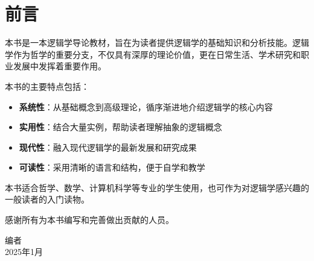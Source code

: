 \chapter*{前言}

本书是一本逻辑学导论教材，旨在为读者提供逻辑学的基础知识和分析技能。逻辑学作为哲学的重要分支，不仅具有深厚的理论价值，更在日常生活、学术研究和职业发展中发挥着重要作用。

本书的主要特点包括：

\begin{itemize}
\item \textbf{系统性}：从基础概念到高级理论，循序渐进地介绍逻辑学的核心内容
\item \textbf{实用性}：结合大量实例，帮助读者理解抽象的逻辑概念
\item \textbf{现代性}：融入现代逻辑学的最新发展和研究成果
\item \textbf{可读性}：采用清晰的语言和结构，便于自学和教学
\end{itemize}

本书适合哲学、数学、计算机科学等专业的学生使用，也可作为对逻辑学感兴趣的一般读者的入门读物。

感谢所有为本书编写和完善做出贡献的人员。

\vspace{1cm}
\begin{flushright}
编者\\
2025年1月
\end{flushright}
